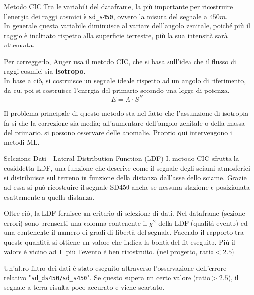 \documentclass[10pt]{beamer}
\begin{document}
\begin{frame}{Metodo CIC}
Tra le variabili del dataframe, la più importante per ricostruire l'energia dei raggi cosmici è \texttt{sd\_s450}, ovvero la misura del segnale a $450 m$.\\ In generale questa variabile diminuisce al variare dell'angolo zenitale, poiché più il raggio è inclinato rispetto alla superficie terrestre, più la sua intensità sarà attenuata.
\bigskip 

Per correggerlo, Auger usa il metodo CIC, che si basa sull'idea che il flusso di raggi cosmici sia \textbf{isotropo}.\\ 
In base a ciò, si costruisce un segnale ideale rispetto ad un angolo di riferimento, da cui poi si costruisce l'energia del primario secondo una legge di potenza.
\begin{equation}
E = A\cdot S^B
\end{equation}

Il problema principale di questo metodo sta nel fatto che l'assunzione di isotropia fa si che la correzione sia media; all'aumentare dell'angolo zenitale o della massa del primario, si possono osservare delle anomalie. Proprio qui intervengono i metodi ML.

\end{frame}

\begin{frame}{Selezione Dati - Lateral Distribution Function (LDF)}
Il metodo CIC sfrutta la cosiddetta LDF, una funzione che descrive come il segnale degli sciami atmosferici si distribuisce sul terreno in funzione della distanza dall'asse dello sciame. Grazie ad essa si può ricostruire il segnale SD450 anche se nessuna stazione è posizionata esattamente a quella distanza.
\bigskip

Oltre ciò, la LDF fornisce un criterio di selezione di dati. Nel dataframe (sezione errori) sono prensenti una colonna contenente il $\chi^2$ della LDF (qualità evento) ed una contenente il numero di gradi di libertà del segnale. Facendo il rapporto tra queste quantità si ottiene un valore che indica la bontà del fit eseguito. Più il valore è vicino ad 1, più l'evento è ben ricostruito. (nel progetto, ratio$<2.5$)
\bigskip

Un'altro filtro dei dati è stato eseguito attraverso l'osservazione dell'errore relativo "\texttt{sd\_ds450/sd\_s450}". Se questo supera un certo valore (ratio$>2.5$), il segnale a terra risulta poco accurato e viene scartato.

\end{frame}
\end{document}
